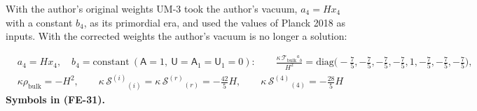 \documentclass[
  10pt,
]{article}
\begin{document}
With the author's original weights UM-3 took the author's vacuum,
\(a_4 = Hx_4\) with a constant \(b_4\), as its primordial era, and used
the values of Planck 2018 as inputs. With the corrected weights the
author's vacuum is no longer a solution:

\[
\begin{aligned}
&a_4 = Hx_4,\quad b_4 = \text{constant}\ (\mathsf{A} = 1,\ \mathsf{U} = \mathsf{A}_1 = \mathsf{U}_1 = 0):\qquad
 \frac{\kappa\,\mathcal{T}_{\mathrm{bulk}}{}^a{}_b}{H^2} = \mathrm{diag}\Big(-\frac75, -\frac75, -\frac75, -\frac75, 1, -\frac75, -\frac75, -\frac75\Big),\\
&\kappa\rho_{\mathrm{bulk}} = -H^2,\qquad \kappa\,\mathcal{S}^{(i)}{}_{(i)} = \kappa\,\mathcal{S}^{(r)}{}_{(r)} = -\frac{42}{5}H,\qquad
 \kappa\,\mathcal{S}^{(4)}{}_{(4)} = -\frac{28}{5}H
\end{aligned} \tag{FE-31}
\] \textbf{Symbols in (FE-31).}
\end{document}
